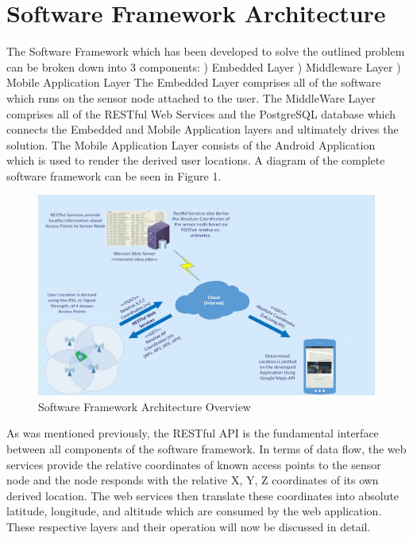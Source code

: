\documentclass[conference]{IEEEtran}
\begin{document}
\section{Software Framework Architecture}
The Software Framework which has been developed to solve the outlined problem can be broken down into 3 components:
) Embedded Layer
) Middleware Layer
) Mobile Application Layer
\newline
The Embedded Layer comprises all of the software which runs on the sensor node attached to the user.
\newline
The MiddleWare Layer comprises all of the RESTful Web Services and the PostgreSQL database which connects the Embedded and Mobile Application layers and ultimately drives the solution.
\newline
The Mobile Application Layer consists of the Android Application which is used to render the derived user locations.
\newline
A diagram of the complete software framework can be seen in Figure 1.
\begin{figure}[H]
    \includegraphics[width=9 cm,height=5.5 cm]{2018-05-10-PHOTO-00000077.jpg}
    \caption{Software Framework Architecture Overview}
    \end{figure}
As was mentioned previously, the RESTful API is the fundamental interface between all components of the software framework. In terms of data flow, the web services provide the relative coordinates of known access points to the sensor node and the node responds with the relative X, Y, Z coordinates of its own derived location. The web services then translate these coordinates into absolute latitude, longitude, and altitude which are consumed by the web application.
\newline
\newline
These respective layers and their operation will now be discussed in detail.
\end{document}
